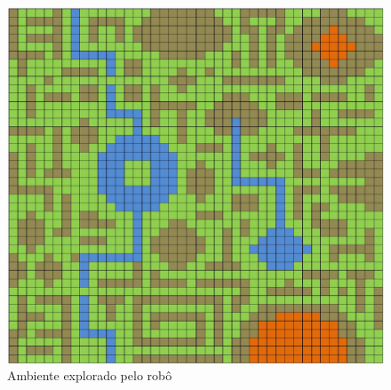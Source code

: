 \documentclass[12pt]{article}
\begin{document}
\begin{figure}[ht]
\centering
\includegraphics[width=.5\textwidth]{imagens/terreno}
\caption{Ambiente explorado pelo robô}
\label{fig:ambiente}
\end{figure}
%
%
%
%
%
%
%
%	 
%	 
\end{document}

